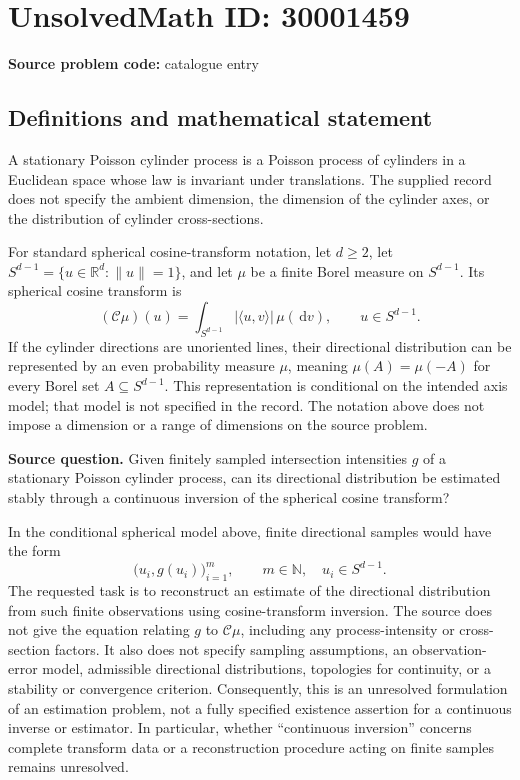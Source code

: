 \documentclass[11pt]{article}
\newcommand{\N}{\mathbb{N}}
\newcommand{\R}{\mathbb{R}}
\newcommand{\dd}{\,\mathrm{d}}
\begin{document}
\section*{UnsolvedMath ID: 30001459}
\textbf{Source problem code:} catalogue entry
\subsection{Definitions and mathematical statement}
A stationary Poisson cylinder process is a Poisson process of cylinders in a Euclidean space whose law is invariant under translations. The supplied record does not specify the ambient dimension, the dimension of the cylinder axes, or the distribution of cylinder cross-sections.

For standard spherical cosine-transform notation, let \(d\geq 2\), let \(S^{d-1}=\{u\in\R^d:\|u\|=1\}\), and let \(\mu\) be a finite Borel measure on \(S^{d-1}\). Its spherical cosine transform is
\[
(\mathcal C\mu)(u)=\int_{S^{d-1}}|\langle u,v\rangle|\,\mu(\dd v),\qquad u\in S^{d-1}.
\]
If the cylinder directions are unoriented lines, their directional distribution can be represented by an even probability measure \(\mu\), meaning \(\mu(A)=\mu(-A)\) for every Borel set \(A\subseteq S^{d-1}\). This representation is conditional on the intended axis model; that model is not specified in the record. The notation above does not impose a dimension or a range of dimensions on the source problem.

\textbf{Source question.} Given finitely sampled intersection intensities \(g\) of a stationary Poisson cylinder process, can its directional distribution be estimated stably through a continuous inversion of the spherical cosine transform?

In the conditional spherical model above, finite directional samples would have the form
\[
\bigl(u_i,g(u_i)\bigr)_{i=1}^{m},\qquad m\in\N,\quad u_i\in S^{d-1}.
\]
The requested task is to reconstruct an estimate of the directional distribution from such finite observations using cosine-transform inversion. The source does not give the equation relating \(g\) to \(\mathcal C\mu\), including any process-intensity or cross-section factors. It also does not specify sampling assumptions, an observation-error model, admissible directional distributions, topologies for continuity, or a stability or convergence criterion. Consequently, this is an unresolved formulation of an estimation problem, not a fully specified existence assertion for a continuous inverse or estimator. In particular, whether ``continuous inversion'' concerns complete transform data or a reconstruction procedure acting on finite samples remains unresolved.
\end{document}
